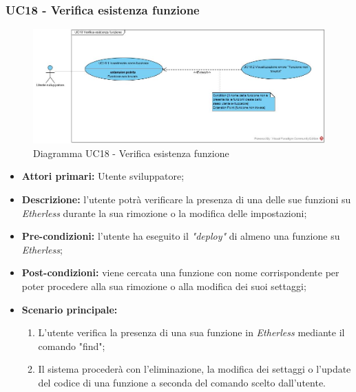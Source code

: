 \subsubsection{UC18 - Verifica esistenza funzione}
\begin{figure}[h]
	\centering
	\includegraphics[width=\linewidth]{res/img/UC18.jpg}
	\caption{Diagramma UC18 - Verifica esistenza funzione}
\end{figure}
\begin{itemize}
	\item \textbf{Attori primari:} Utente sviluppatore;
	\item \textbf{Descrizione:} l'utente potrà verificare la presenza di una delle sue funzioni su \textit{Etherless} durante la sua rimozione o la modifica delle impostazioni; 
	\item \textbf{Pre-condizioni:} l'utente ha eseguito il \textit{"deploy\glos"} di almeno una funzione su \textit{Etherless};
	\item \textbf{Post-condizioni:} viene cercata una funzione con nome corrispondente per poter procedere alla sua rimozione o alla modifica dei suoi settaggi;
	\item \textbf{Scenario principale:} 
	\begin{enumerate}
		\item L'utente verifica la presenza di una sua funzione in \textit{Etherless} mediante il comando "find";
		\item Il sistema procederà con l'eliminazione, la modifica dei settaggi o l'update del codice di una funzione a seconda del comando scelto dall'utente.
	\end{enumerate}
\end{itemize}